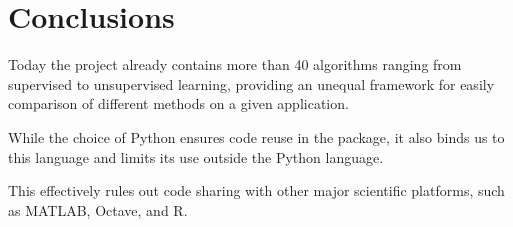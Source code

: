 \documentclass[twoside,11pt]{article}
\begin{document}
\section{Conclusions}

Today the project already contains more than 40 algorithms ranging
from supervised to unsupervised learning, providing an unequal
framework for easily comparison of different methods on a given
application.

While the choice of Python ensures code reuse in the package, it also
binds us to this language and limits its use outside the Python
language.

This effectively rules out code sharing with other major scientific
platforms, such as MATLAB\texttrademark, Octave, and R.




\end{document}
